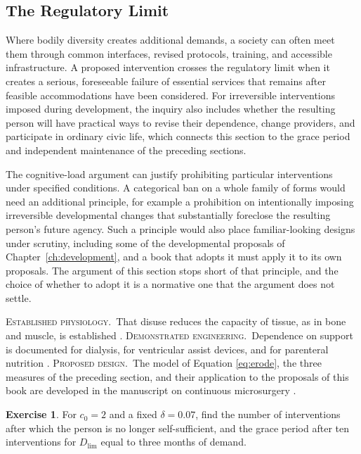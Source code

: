 \documentclass[11pt,openany]{book}
\theoremstyle{definition}
\newtheorem{exercise}{Exercise}[chapter]
\theoremstyle{remark}
\newcommand{\est}{\textsc{Established physiology.}\ }
\newcommand{\dem}{\textsc{Demonstrated engineering.}\ }
\newcommand{\pro}{\textsc{Proposed design.}\ }
\begin{document}
\subsection*{The Regulatory Limit}

Where bodily diversity creates additional demands, a society can often meet them through common interfaces, revised protocols, training, and accessible infrastructure. A proposed intervention crosses the regulatory limit when it creates a serious, foreseeable failure of essential services that remains after feasible accommodations have been considered. For irreversible interventions imposed during development, the inquiry also includes whether the resulting person will have practical ways to revise their dependence, change providers, and participate in ordinary civic life, which connects this section to the grace period and independent maintenance of the preceding sections.

The cognitive-load argument can justify prohibiting particular interventions under specified conditions. A categorical ban on a whole family of forms would need an additional principle, for example a prohibition on intentionally imposing irreversible developmental changes that substantially foreclose the resulting person's future agency. Such a principle would also place familiar-looking designs under scrutiny, including some of the developmental proposals of Chapter~\ref{ch:development}, and a book that adopts it must apply it to its own proposals. The argument of this section stops short of that principle, and the choice of whether to adopt it is a normative one that the argument does not settle.

\begin{evidence}
\est That disuse reduces the capacity of tissue, as in bone and muscle, is established \cite{frost1987}. \dem Dependence on support is documented for dialysis, for ventricular assist devices, and for parenteral nutrition \cite{mehra2017,gura2016}. \pro The model of Equation \eqref{eq:erode}, the three measures of the preceding section, and their application to the proposals of this book are developed in the manuscript on continuous microsurgery \cite{flyxion2026cm}.
\end{evidence}

\begin{exercise}
For $c_0=2$ and a fixed $\delta=0.07$, find the number of interventions after which the person is no longer self-sufficient, and the grace period after ten interventions for $D_{\lim}$ equal to three months of demand.
\end{exercise}
\end{document}
